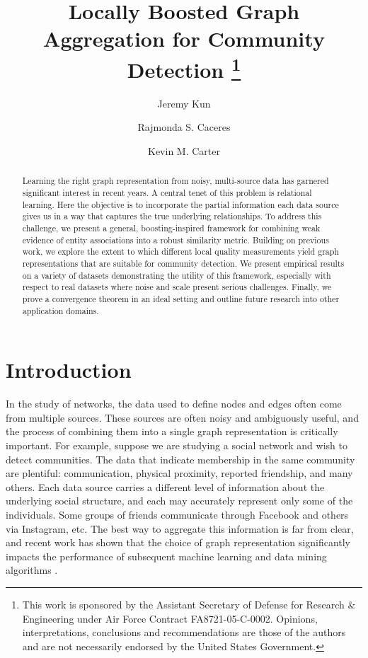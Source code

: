\documentclass{article}
\begin{document}
\title{Locally Boosted Graph Aggregation for Community Detection \thanks{This work
is sponsored by the Assistant Secretary of Defense for Research \& Engineering
under Air Force Contract FA8721-05-C-0002.  Opinions, interpretations,
conclusions and recommendations are those of the authors and are not
necessarily endorsed by the United States Government.}}
\author[1,2]{Jeremy Kun}%
\author[1]{Rajmonda S. Caceres}%
\author[1]{Kevin M. Carter}%


\date{}

\maketitle

\begin{abstract} \small \baselineskip=9pt 
Learning the right graph representation from noisy, multi-source data has
garnered significant interest in recent years. A central tenet of this problem
is relational learning. Here the objective is to incorporate the partial
information each data source gives us in a way that captures the true
underlying relationships. To address this challenge, we present a general,
boosting-inspired framework for combining weak evidence of entity associations
into a robust similarity metric. Building on previous work, we explore the
extent to which different local quality measurements yield graph
representations that are suitable for community detection. We present empirical
results on a variety of datasets demonstrating the utility of this framework,
especially with respect to real datasets where noise and scale present serious
challenges. Finally, we prove a convergence theorem in an ideal setting
and outline future research into other application domains.  \end{abstract}

 
 
\section{Introduction}
In the study of networks, the data used to define nodes and edges often come
from multiple sources. These sources are often noisy and ambiguously useful,
and the process of combining them into a single graph representation is
critically important. For example, suppose we are studying a social network and
wish to detect communities. The data that indicate membership in the same
community are plentiful: communication, physical proximity, reported
friendship, and many others. Each data source carries a different level of
information about the underlying social structure, and each may accurately
represent only some of the individuals. Some groups of friends communicate
through Facebook and others via Instagram, etc. The best way to aggregate 
this information is far from clear, and recent work has shown that the choice
of graph representation significantly impacts the performance of subsequent 
machine learning and data mining algorithms
\cite{Getoor2005,Gallagher2008,Neville2005,Caceres2011,Miller2014}. 
\end{document}
